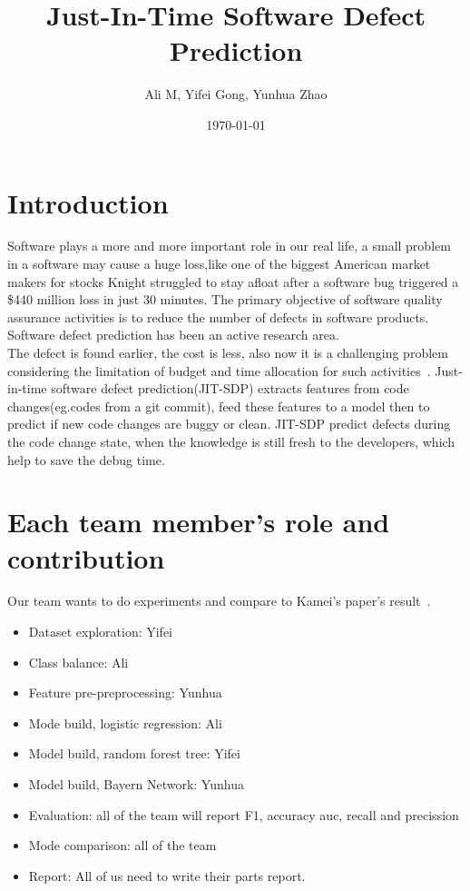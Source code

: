 \documentclass{article}
\title{Just-In-Time Software Defect Prediction}
\author{Ali M, Yifei Gong, Yunhua Zhao}
\date{\today}
\begin{document}
\maketitle

\section{Introduction}
Software plays a more and more important role in our real life, a small problem in a software may cause a huge loss,like one of the biggest American market makers for stocks Knight struggled to stay afloat after a software bug triggered a \$440 million loss in just 30 minutes. The primary objective of software quality assurance activities is to reduce the number of defects in software products. Software defect prediction has been an active research area. \\
The defect is found earlier, the cost is less, also now it is a challenging problem considering the limitation of budget and time allocation for such activities~\cite{wan2018perceptions}. Just-in-time software defect prediction(JIT-SDP) extracts features from code changes(eg.codes from a git commit), feed these features to a model then to predict if new code changes are buggy or clean. JIT-SDP predict defects during the code change state, when the knowledge is still fresh to the developers, which help to save the debug time.

\section{Each team member’s role and contribution}
Our team wants to do experiments and compare to Kamei's paper's result~\cite{kamei2012large}.\\
\begin{itemize}
	\item Dataset exploration: Yifei 
	\item Class balance: Ali
	\item Feature pre-preprocessing: Yunhua
	\item Mode build, logistic regression: Ali
	\item Model build, random forest tree: Yifei
	\item Model build, Bayern Network: Yunhua
	\item Evaluation: all of the team will report F1, accuracy auc, recall and precission
	\item Mode comparison: all of the team
	\item Report: All of us need to write their parts report.
\end{itemize}
\end{document}
